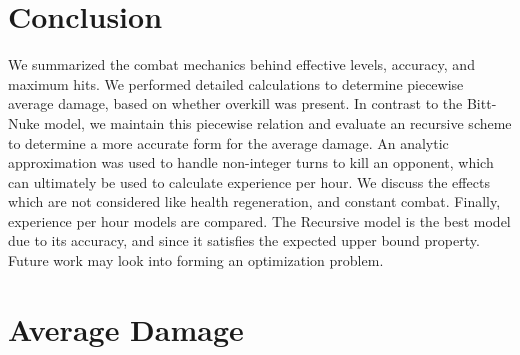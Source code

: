 \documentclass[../../main.tex]{subfiles}
\begin{document}
	\section{Conclusion}
		We summarized the combat mechanics behind effective levels, accuracy, and maximum hits. We performed detailed calculations to determine piecewise average damage, based on whether overkill was present. In contrast to the Bitt-Nuke model, we maintain this piecewise relation and evaluate an recursive scheme to determine a more accurate form for the average damage. An analytic approximation was used to handle non-integer turns to kill an opponent, which can ultimately be used to calculate experience per hour. We discuss the effects which are not considered like health regeneration, and constant combat. Finally, experience per hour models are compared. The Recursive model is the best model due to its accuracy, and since it satisfies the expected upper bound property. Future work may look into forming an optimization problem.














		\newpage
		\appendix
		\titleformat{\section}[display]{\normalfont\Large\bfseries}{\appendixname\enspace\thesection}{.5em}{}
		\section{Average Damage}
\end{document}
